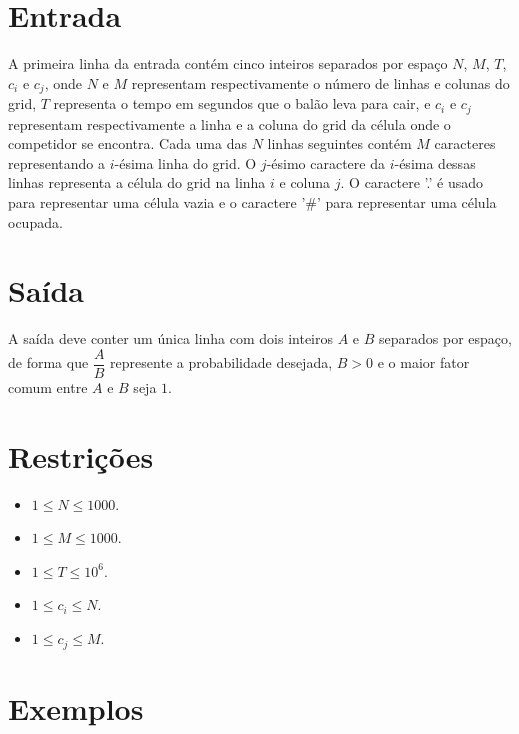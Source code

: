 \section*{Entrada}

A primeira linha da entrada contém cinco inteiros separados por espaço $N$, $M$, $T$, $c_i$ e $c_j$, onde $N$ e $M$ representam respectivamente o
número de linhas e colunas do grid, $T$ representa o tempo em segundos que o balão leva para cair, e $c_i$ e $c_j$ representam respectivamente a linha e a coluna do grid da célula onde o competidor se
encontra. Cada uma das $N$ linhas seguintes contém $M$ caracteres representando a $i$-ésima linha do grid. O $j$-ésimo caractere da $i$-ésima dessas linhas representa a célula do grid na linha $i$ e coluna $j$.
O caractere '.' é usado para representar uma célula vazia e o caractere '\#' para representar uma célula ocupada.

\section*{Saída}
A saída deve conter um única linha com dois inteiros $A$ e $B$ separados por espaço, de forma que $\dfrac{A}{B}$ represente a probabilidade desejada, $B > 0$ e o maior fator comum entre $A$ e $B$ seja $1$.
\section*{Restrições}

\begin{itemize}
    \item $1 \leq N \leq 1000$.
    \item $1 \leq M \leq 1000$.
    \item $1 \leq T \leq {10}^6$.
    \item $1 \leq c_i \leq N$.
    \item $1 \leq c_j \leq M$.
\end{itemize}


\section*{Exemplos}

\exemplo
